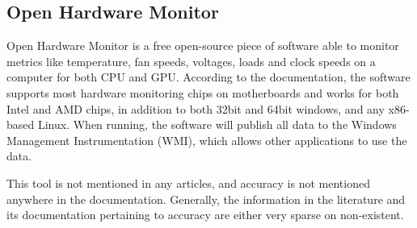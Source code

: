 \subsection{Open Hardware Monitor}

Open Hardware Monitor is a free open-source piece of software able to monitor metrics like temperature, fan speeds, voltages, loads and clock speeds on a computer for both CPU and GPU. According to the documentation, the software supports most hardware monitoring chips on motherboards and works for both Intel and AMD chips, in addition to both 32bit and 64bit windows, and any x86-based Linux. When running, the software will publish all data to the Windows Management Instrumentation (WMI), which allows other applications to use the data.\cite[]{open_hardware_monitor}

This tool is not mentioned in any articles, and accuracy is not mentioned anywhere in the documentation. Generally, the information in the literature and its documentation pertaining to accuracy are either very sparse on non-existent.